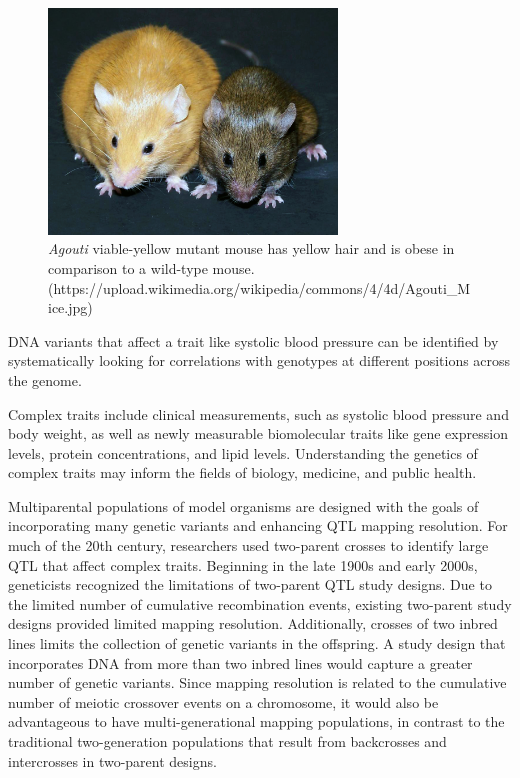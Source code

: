 \documentclass[]{article}\usepackage[]{graphicx}\usepackage[]{color}
\begin{document}
\begin{figure}
\includegraphics[height=6cm]{figs/Agouti.jpg}
\caption{\emph{Agouti} viable-yellow mutant mouse has yellow hair and is obese in comparison to a wild-type mouse. \tiny{(https://upload.wikimedia.org/wikipedia/commons/4/4d/Agouti\_Mice.jpg)}}
\label{fig:agouti}
\end{figure}


DNA variants that affect a trait like systolic blood pressure
can be identified by systematically looking for correlations with genotypes at different positions across the genome.

Complex traits include
clinical measurements, such as systolic blood pressure and body weight, as
well as newly measurable biomolecular traits like gene expression
levels, protein concentrations, and lipid levels.
Understanding the
genetics of complex traits may inform the fields of biology,
medicine, and public health.


Multiparental populations of model organisms are designed with the goals of 
incorporating many genetic variants and enhancing QTL mapping resolution.
For much of the 20th century, researchers used two-parent crosses to identify large QTL that affect complex traits. 
Beginning in the late 1900s and early 2000s, geneticists recognized the limitations 
of two-parent QTL study designs. 
Due to the limited number of cumulative recombination events, existing two-parent study designs provided limited mapping resolution. 
Additionally, crosses of two inbred lines limits the collection of genetic variants in the offspring.
A study design that incorporates DNA from more than two inbred lines would capture a greater number of genetic variants. 
Since mapping resolution is related to the cumulative number of meiotic crossover 
events on a chromosome, it would also be advantageous to have multi-generational mapping
populations, in contrast to the traditional two-generation populations
that result from backcrosses and intercrosses in two-parent designs.
\end{document}

